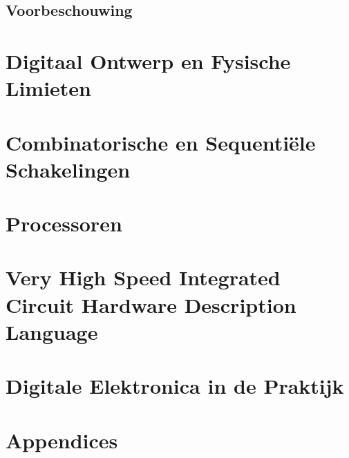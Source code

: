 \documentclass[a4paper,10pt,titlepage]{book}
\begin{document}

\chapter*{Voorbeschouwing}

\mainmatter
\part{Digitaal Ontwerp en Fysische Limieten}



\part{Combinatorische en Sequenti\"ele Schakelingen}



\part{Processoren}



\part{Very High Speed Integrated Circuit Hardware Description Language}


\part{Digitale Elektronica in de Praktijk}



\appendix
\part{Appendices}




\backmatter
\listoftables
\listoffigures
{}
\begin{twocolumn}


\label{biblio}
\end{twocolumn}
\label{glos}
\printglossary[title=Woordenlijst,toctitle=Woordenlijst]
\label{idx}
\printindex
\end{document}
